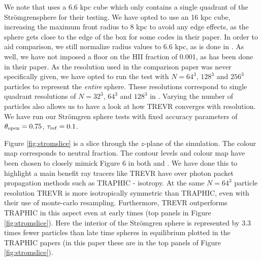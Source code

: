 \documentclass[fleq,usenatbib]{mnras}
\newcommand{\acro}{TREVR}
\newcommand{\strom}{Str\"omgren}
\begin{document}
We note that \cite{ilievEt06} uses a 6.6 kpc cube which only contains a single
quadrant of the \strom sphere for their testing. We have opted to use an 16 
kpc cube, increasing the maximum front radius to 8 kpc to avoid any edge 
effects, as the sphere gets close to the edge of the box for some codes in 
their paper. In order to aid comparison, we still normalize radius values to 
6.6 kpc, as is done in \cite{ilievEt06}. As well, we have not imposed a floor 
on the HII fraction of 0.001, as has been done in their paper. As the 
resolution used in the \cite{ilievEt06} comparison paper was never 
specifically given, we have opted to run the test with $N = 64^3$, $128^3$ and 
$256^3$ particles to represent the \textit{entire} sphere. These resolutions 
correspond to single quadrant resolutions of $N=32^3$, $64^3$ and $128^3$ in 
\cite{ilievEt06}. Varying the number of particles also allows us to have a 
look at how \acro{} converges with resolution. We have run our \strom{} sphere 
tests with fixed accuracy parameters of $\theta_{\rm open} = 0.75$, 
$\tau_{\rm ref} = 0.1$.

Figure \ref{fig:stromslice} is a slice through the $z$-plane of the 
simulation. The colour map corresponds to neutral fraction. The contour 
levels and colour map have been chosen to closely mimick Figure 6 in both 
\cite{pawlikSchaye08} and \cite{pawlikSchaye11}. We have done this to 
highlight a main benefit ray tracers like \acro{} have over photon packet 
propagation methods such as TRAPHIC - isotropy. At the same $N=64^3$ particle 
resolution \acro{} is more isotropically symmetric than TRAPHIC, even with 
their use of monte-carlo resampling. Furthermore, \acro{} outperforms TRAPHIC 
in this aspect even at early times (top panels in Figure 
\ref{fig:stromslice}). Here the interior of the \strom{} sphere is represented 
by 3.3 times fewer particles than late time spheres in equilibrium plotted in 
the TRAPHIC papers (in this paper these are in the top panels of Figure 
\ref{fig:stromslice}).
\end{document}
